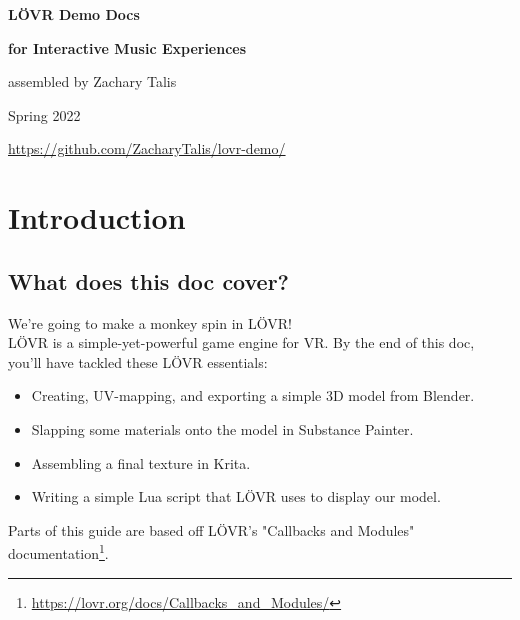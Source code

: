 \documentclass[12pt, letterpaper]{article}
\begin{document}
\begin{titlepage}
    \begin{center}

        \vspace*{5cm}

        \Large{\textbf{L{\"O}VR Demo Docs}}

        \vspace{-0.25cm}

        \Large{\textbf{for Interactive Music Experiences}}

        \vspace{0.5cm}

        \large{assembled by Zachary Talis}

        \vfill

        \small{Spring 2022}

        \small\url{https://github.com/ZacharyTalis/lovr-demo/}

    \end{center}
\end{titlepage}

\tableofcontents
\newpage

\section{Introduction}

\subsection{What does this doc cover?}
We're going to make a monkey spin in L{\"O}VR!\\
L{\"O}VR is a simple-yet-powerful game engine for VR. By the end of this doc, you'll have tackled these L{\"O}VR essentials:
\begin{itemize}
    \item Creating, UV-mapping, and exporting a simple 3D model from Blender.
    \item Slapping some materials onto the model in Substance Painter.
    \item Assembling a final texture in Krita.
    \item Writing a simple Lua script that L{\"O}VR uses to display our model.
\end{itemize}
Parts of this guide are based off L{\"O}VR's "Callbacks and Modules" documentation\footnote{\url{https://lovr.org/docs/Callbacks_and_Modules/}}.
\end{document}

